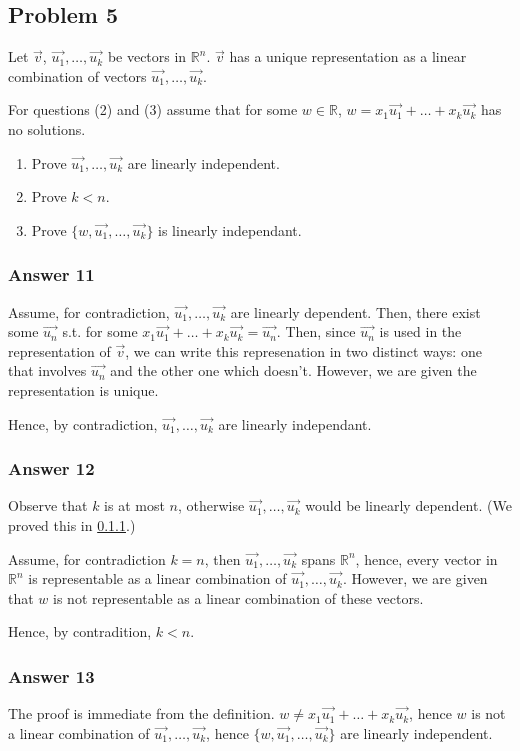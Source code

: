 \documentclass[11pt]{article}
\begin{document}
\subsection{Problem 5}
\label{sec:orgheadline18}
Let \(\vec{v}\), \(\vec{u_1},\dots,\vec{u_k}\) be vectors in \(\mathbb{R}^n\).
\(\vec{v}\) has a unique representation as a linear combination of vectors
\(\vec{u_1},\dots,\vec{u_k}\).

For questions (2) and (3) assume that for some \(w \in \mathbb{R}\), \(w =
   x_1\vec{u_1}+\dots+x_k\vec{u_k}\) has no solutions.

\begin{enumerate}
\item Prove \(\vec{u_1},\dots,\vec{u_k}\) are linearly independent.
\item Prove \(k < n\).
\item Prove \(\{w, \vec{u_1},\dots,\vec{u_k}\}\) is linearly independant.
\end{enumerate}

\subsubsection{Answer 11}
\label{sec:orgheadline15}
Assume, for contradiction, \(\vec{u_1},\dots,\vec{u_k}\) are linearly
dependent.  Then, there exist some \(\vec{u_n}\) s.t. for some
\(x_1\vec{u_1}+\dots+x_k\vec{u_k}=\vec{u_n}\).  Then, since \(\vec{u_n}\) is
used in the representation of \(\vec{v}\), we can write this represenation
in two distinct ways: one that involves \(\vec{u_n}\) and the other one
which doesn't.  However, we are given the representation is unique.

Hence, by contradiction, \(\vec{u_1},\dots,\vec{u_k}\) are linearly
independant.

\subsubsection{Answer 12}
\label{sec:orgheadline16}
Observe that \(k\) is at most \(n\), otherwise \(\vec{u_1},\dots,\vec{u_k}\) would
be linearly dependent.  (We proved this in \ref{sec:orgheadline15}.)

Assume, for contradiction \(k = n\), then \(\vec{u_1},\dots,\vec{u_k}\) spans
\(\mathbb{R}^n\), hence, every vector in \(\mathbb{R}^n\) is representable as a
linear combination of \(\vec{u_1},\dots,\vec{u_k}\).  However, we are given
that \(w\) is not representable as a linear combination of these vectors.

Hence, by contradition, \(k < n\).

\subsubsection{Answer 13}
\label{sec:orgheadline17}
The proof is immediate from the definition. \(w \neq
    x_1\vec{u_1}+\dots+x_k\vec{u_k}\), hence \(w\) is not a linear combination of
\(\vec{u_1},\dots,\vec{u_k}\), hence \(\{w, \vec{u_1},\dots,\vec{u_k}\}\) are
linearly independent.
\end{document}
